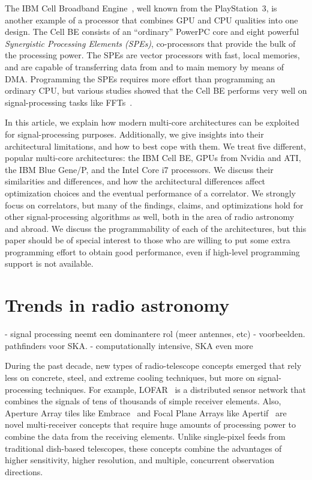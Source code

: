 \documentclass{article}
\begin{document}
The IBM Cell Broadband Engine~\cite{Gschwind:06}, well known from the
PlayStation~3, is another example of a processor that combines GPU and CPU
qualities into one design.
The Cell BE consists of an ``ordinary'' PowerPC core and eight powerful
\emph{Synergistic Processing Elements (SPEs)}, co-processors that provide
the bulk of the processing power.
The SPEs are vector processors with fast, local memories, and are capable
of transferring data from and to main memory by means of DMA.
Programming the SPEs requires more effort than programming an ordinary CPU,
but various studies showed that the Cell BE performs very well on
signal-processing tasks like FFTs~\cite{?}.

In this article, we explain how modern multi-core architectures can be
exploited for signal-processing purposes.
Additionally, we give insights into their architectural limitations, and how
to best cope with them.
We treat five different, popular multi-core architectures: the IBM Cell BE,
GPUs from Nvidia and ATI, the IBM Blue Gene/P, and
the Intel Core i7 processors.
We discuss their similarities and differences, and how the architectural
differences affect optimization choices and the eventual performance of a
correlator.
We strongly focus on correlators, but many of the findings, claims, and
optimizations hold for other signal-processing algorithms as well, both in the
area of radio astronomy and abroad.
We discuss the programmability of each of the architectures, but this paper
should be of special interest to those who are willing to put some extra
programming effort to obtain good performance, even if high-level programming
support is not available.


\section{Trends in radio astronomy}

- signal processing neemt een dominantere rol (meer antennes, etc)
- voorbeelden. pathfinders voor SKA. 
- computationally intensive, SKA even more



During the past decade, new types of radio-telescope concepts emerged that
rely less on concrete, steel, and extreme cooling techniques, but more on
signal-processing techniques.
For example, LOFAR~\cite{Butcher:04,deVos:09} is a distributed sensor network
that combines the signals of tens of thousands of simple receiver elements.
Also, Aperture Array tiles like Embrace~\cite{?} and Focal Plane Arrays
like Apertif~\cite{?} are novel multi-receiver concepts that require huge
amounts of processing power to combine the data from the receiving elements.
Unlike single-pixel feeds from traditional dish-based telescopes, these
concepts combine the advantages of higher sensitivity, higher resolution,
and multiple, concurrent observation directions.
\end{document}
